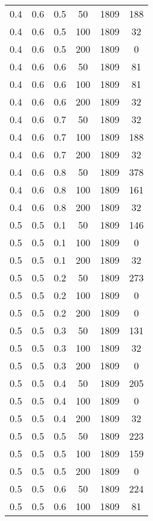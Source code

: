 \begin{center}
\begin{longtable}[c]{|c|c|c|c|c|c|}
	   \hline
		0.4 &  0.6 &  0.5 &   50 &  1809 &   188 \\
		0.4 &  0.6 &  0.5 &  100 &  1809 &    32 \\
		0.4 &  0.6 &  0.5 &  200 &  1809 &     0 \\
	   \hline
		0.4 &  0.6 &  0.6 &   50 &  1809 &    81 \\
		0.4 &  0.6 &  0.6 &  100 &  1809 &    81 \\
		0.4 &  0.6 &  0.6 &  200 &  1809 &    32 \\
	   \hline
		0.4 &  0.6 &  0.7 &   50 &  1809 &    32 \\
		0.4 &  0.6 &  0.7 &  100 &  1809 &   188 \\
		0.4 &  0.6 &  0.7 &  200 &  1809 &    32 \\
	   \hline
		0.4 &  0.6 &  0.8 &   50 &  1809 &   378 \\
		0.4 &  0.6 &  0.8 &  100 &  1809 &   161 \\
		0.4 &  0.6 &  0.8 &  200 &  1809 &    32 \\
	   \hline
		0.5 &  0.5 &  0.1 &   50 &  1809 &   146 \\
		0.5 &  0.5 &  0.1 &  100 &  1809 &     0 \\
		0.5 &  0.5 &  0.1 &  200 &  1809 &    32 \\
	   \hline
		0.5 &  0.5 &  0.2 &   50 &  1809 &   273 \\
		0.5 &  0.5 &  0.2 &  100 &  1809 &     0 \\
		0.5 &  0.5 &  0.2 &  200 &  1809 &     0 \\
	   \hline
		0.5 &  0.5 &  0.3 &   50 &  1809 &   131 \\
		0.5 &  0.5 &  0.3 &  100 &  1809 &    32 \\
		0.5 &  0.5 &  0.3 &  200 &  1809 &     0 \\
	   \hline
		0.5 &  0.5 &  0.4 &   50 &  1809 &   205 \\
		0.5 &  0.5 &  0.4 &  100 &  1809 &     0 \\
		0.5 &  0.5 &  0.4 &  200 &  1809 &    32 \\
	   \hline
		0.5 &  0.5 &  0.5 &   50 &  1809 &   223 \\
		0.5 &  0.5 &  0.5 &  100 &  1809 &   159 \\
		0.5 &  0.5 &  0.5 &  200 &  1809 &     0 \\
	   \hline
		0.5 &  0.5 &  0.6 &   50 &  1809 &   224 \\
		0.5 &  0.5 &  0.6 &  100 &  1809 &    81 \\

\end{longtable}
\end{center}
